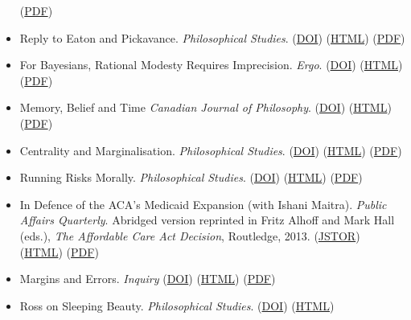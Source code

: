\documentclass[
  10pt,
  letterpaper,
  DIV=11,
  numbers=noendperiod,
  twoside]{scrartcl}
\begin{document}
\begin{itemize}
  (\href{./posts/reply-blackson/Reply\%20to\%20Blackson.pdf}{PDF})
\item
  Reply to Eaton and Pickavance. \emph{Philosophical Studies}.
  (\href{https://doi.org/10.1007/s11098-016-0660-0}{DOI})
  (\href{./posts/reply-eaton-pickavance/reply-to-eaton-and-pickavance.html}{HTML})
  (\href{./posts/reply-eaton-pickavance/Reply\%20to\%20Eaton\%20and\%20Pickavance.pdf}{PDF})
\item
  For Bayesians, Rational Modesty Requires Imprecision. \emph{Ergo}.
  (\href{http://dx.doi.org/10.1111/j.0031-8094.2001.00224.x}{DOI})
  (\href{./posts/modesty/for-bayesians-rational-modesty-requires-imprecision.html}{HTML})
  (\href{./posts/modesty/For\%20Bayesians,\%20Rational\%20Modesty\%20Requires\%20Imprecision.pdf}{PDF})
\item
  Memory, Belief and Time \emph{Canadian Journal of Philosophy}.
  (\href{http://dx.doi.org/10.1111/j.0031-8094.2001.00224.x}{DOI})
  (\href{./posts/mbt/memory-belief-and-time.qmd}{HTML})
  (\href{./posts/mbt/Memory,\%20Belief\%20and\%20Time.pdf}{PDF})
\item
  Centrality and Marginalisation. \emph{Philosophical Studies}.
  (\href{http://dx.doi.org/10.1007/s11098-014-0289-9}{DOI})
  (\href{./posts/herman/centrality-and-marginalisation.qmd}{HTML})
  (\href{./posts/herman/Centrality\%20and\%20Marginalisation.pdf}{PDF})
\item
  Running Risks Morally. \emph{Philosophical Studies}.
  (\href{http://dx.doi.org/10.1007/s11098-013-0227-2}{DOI})
  (\href{./posts/rrm/running-risks-morally.html}{HTML})
  (\href{./posts/rrm/Running\%20Risks\%20Morally.pdf}{PDF})
\item
  In Defence of the ACA's Medicaid Expansion (with Ishani Maitra).
  \emph{Public Affairs Quarterly}. Abridged version reprinted in Fritz
  Alhoff and Mark Hall (eds.), \emph{The Affordable Care Act Decision},
  Routledge, 2013. (\href{https://www.jstor.org/stable/43574523}{JSTOR})
  (\href{./posts/aca/aca-medicaid.html}{HTML})
  (\href{./posts/aca/In\%20Defense\%20of\%20the\%20ACA's\%20Medicaid\%20Expansion.pdf}{PDF})
\item
  Margins and Errors. \emph{Inquiry}
  (\href{http://dx.doi.org/10.1080/0020174X.2013.775015}{DOI})
  (\href{./posts/mae/margins-and-errors.html}{HTML})
  (\href{./posts/mae/Margins\%20and\%20Errors.pdf}{PDF})
\item
  Ross on Sleeping Beauty. \emph{Philosophical Studies}.
  (\href{http://dx.doi.org/10.1007/s11098-011-9827-x}{DOI})
  (\href{./posts/ross-sleeping-beauty/ross-on-sleeping-beauty.html}{HTML})

\end{itemize}
\end{document}
